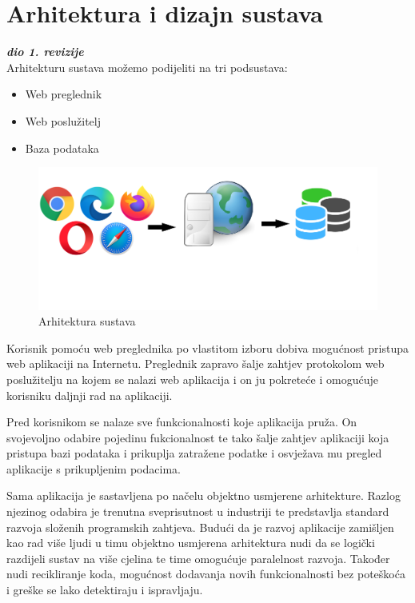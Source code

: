 \chapter{Arhitektura i dizajn sustava}
		
		\textbf{\textit{dio 1. revizije}}\\

		
		Arhitekturu sustava možemo podijeliti na tri podsustava:
		\begin{itemize}
			\item Web preglednik
			\item Web poslužitelj
			\item Baza podataka
		\end{itemize}
	
		
		\begin{figure}[H]
			\includegraphics[scale=0.35]{slike/arhitektura.png} %
			\centering
			\caption {Arhitektura sustava}
			\label{fig:promjene}
		\end{figure}
		
		Korisnik pomoću web preglednika po vlastitom izboru dobiva mogućnost  pristupa web aplikaciji na  Internetu. Preglednik zapravo šalje zahtjev protokolom web poslužitelju na kojem se nalazi web aplikacija i on ju pokreteće i omogućuje korisniku daljnji rad na aplikaciji.
		
		Pred korisnikom se nalaze sve funkcionalnosti koje aplikacija pruža. On svojevoljno odabire pojedinu fukcionalnost te tako šalje zahtjev aplikaciji koja pristupa bazi podataka i prikuplja zatražene podatke i osvježava mu pregled aplikacije s prikupljenim podacima. 

		Sama aplikacija je sastavljena po načelu objektno usmjerene arhitekture. Razlog njezinog odabira je trenutna sveprisutnost u industriji te predstavlja standard razvoja složenih programskih zahtjeva. Budući da je razvoj aplikacije zamišljen kao rad više ljudi u timu  objektno usmjerena arhitektura nudi da se logički razdijeli sustav na više cjelina te time omogućuje paralelnost razvoja.
		Također nudi recikliranje koda, mogućnost dodavanja novih funkcionalnosti bez poteškoća i greške se lako detektiraju i ispravljaju.
		
